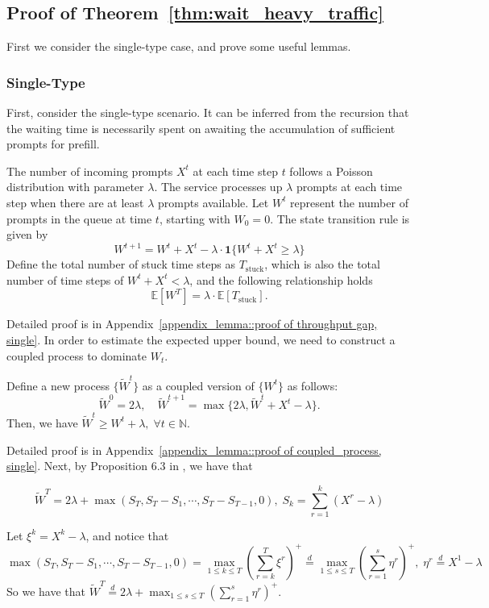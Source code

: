 \subsection{Proof of Theorem~\ref{thm:wait_heavy_traffic}}\label{appexidx::proof of wait_heavy_traffic}
First we consider the single-type case, and prove some useful lemmas.
\subsubsection{Single-Type}

First, consider the single-type scenario. It can be inferred from the recursion that the waiting time is necessarily spent on awaiting the accumulation of sufficient prompts for prefill.
\begin{lemma}\label{lemma::throughput gap, single}
The number of incoming prompts $X^t$ at each time step $t$ follows a Poisson distribution with parameter $\lambda$. The service processes up $\lambda$ prompts at each time step when there are at least $\lambda$ prompts available. Let $W^t$ represent the number of prompts in the queue at time $t$, starting with $W_0=0$. The state transition rule is given by
$$W^{t+1}=W^t+X^t-\lambda\cdot \mathbf{1}\{W^t+X^t\geq \lambda\}$$
Define the total number of stuck time steps as $T_{\text{stuck}}$, which is also the total number of time steps of $W^t+X^t<\lambda$, and the following relationship holds
$$\mathbb{E}[W^T]= \lambda\cdot\mathbb{E}[T_{\text{stuck}}].$$
\end{lemma}
Detailed proof is in Appendix~\ref{appendix_lemma::proof of throughput gap, single}. In order to estimate the expected upper bound, we need to construct a coupled process to dominate $W_t$.

\begin{lemma}\label{lem:coupled_process, single}
Define a new process $\{\tilde{W}^t\}$ as a coupled version of $\{W^t\}$ as follows:
$$
\tilde{W}^0 = 2\lambda, \quad \tilde{W}^{t+1} = \max\{ 2\lambda, \tilde{W}^t + X^t - \lambda \}.
$$
Then, we have $\tilde{W}^t \geq W^t + \lambda, \;\forall t\in \mathbb{N}$.
\end{lemma}
Detailed proof is in Appendix~\ref{appendix_lemma::proof of coupled_process, single}. Next, by Proposition 6.3 in \cite{asmussen2003applied}, we have that 
\begin{lemma}
    $$\tilde{W}^T=2\lambda+\max(S_T, S_T-S_1,\cdots,S_T-S_{T-1},0),\; S_k=\sum_{r=1}^k (X^r-\lambda) $$
\end{lemma}
Let $\xi^k = X^k-\lambda$, and notice that 
$$\max(S_T, S_T-S_1,\cdots,S_T-S_{T-1},0)=\max_{1\leq k\leq T}(\sum_{r=k}^{T}\xi^r)^+\overset{d}{=}\max_{1\leq s\leq T}(\sum_{r=1}^{s}\eta^r)^+, \; \eta^r\overset{d}{=}X^1-\lambda$$
So we have that $\tilde{W}^T \overset{d}{=}2\lambda+\max_{1\leq s\leq T}(\sum_{r=1}^{s}\eta^r)^+ $. 

